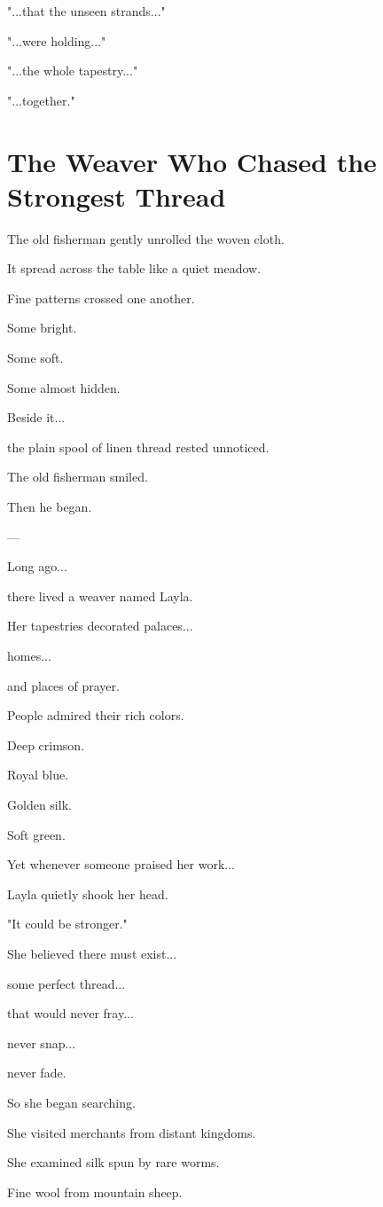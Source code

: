 \documentclass[12pt,openany]{book}
\begin{document}
"...that the unseen strands..."

"...were holding..."

"...the whole tapestry..."

"...together."
\section*{The Weaver Who Chased the Strongest Thread}

The old fisherman gently unrolled the woven cloth.

It spread across the table like a quiet meadow.

Fine patterns crossed one another.

Some bright.

Some soft.

Some almost hidden.

Beside it...

the plain spool of linen thread rested unnoticed.

The old fisherman smiled.

Then he began.

---

Long ago...

there lived a weaver named Layla.

Her tapestries decorated palaces...

homes...

and places of prayer.

People admired their rich colors.

Deep crimson.

Royal blue.

Golden silk.

Soft green.

Yet whenever someone praised her work...

Layla quietly shook her head.

"It could be stronger."

She believed there must exist...

some perfect thread...

that would never fray...

never snap...

never fade.

So she began searching.

She visited merchants from distant kingdoms.

She examined silk spun by rare worms.

Fine wool from mountain sheep.
\end{document}
